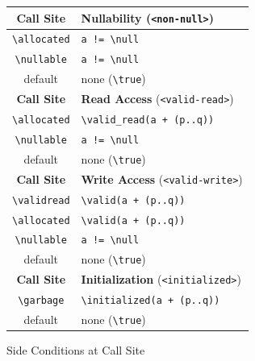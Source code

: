 \begin{figure}[htbp]
\begin{center}
   \begin{tabular}{|c|l|}
     \hline
     \textbf{Call Site} & \textbf{Nullability} (\verb+<non-null>+)\\
     \hline
     \verb+\allocated+  & \verb$a != \null$ \\
     \verb+\nullable+   & \verb$a != \null$ \\
     default            & none (\verb+\true+) \\
     \hline
     \textbf{Call Site} & \textbf{Read Access} (\verb+<valid-read>+)\\
     \hline
     \verb+\allocated+  & \verb$\valid_read(a + (p..q))$ \\
     \verb+\nullable+   & \verb$a != \null$ \\
     default            & none (\verb+\true+) \\
     \hline
     \textbf{Call Site} & \textbf{Write Access} (\verb+<valid-write>+)\\
     \hline
     \verb+\validread+  & \verb$\valid(a + (p..q))$ \\
     \verb+\allocated+  & \verb$\valid(a + (p..q))$ \\
     \verb+\nullable+   & \verb$a != \null$ \\
     default            & none (\verb+\true+) \\
     \hline
     \textbf{Call Site} & \textbf{Initialization} (\verb+<initialized>+)\\
     \hline
     \verb+\garbage+    & \verb$\initialized(a + (p..q))$ \\
     default            & none (\verb+\true+) \\
     \hline
   \end{tabular}
\end{center}
\caption{Side Conditions at Call Site}
\label{fig:callsite-attributes}
\end{figure}

